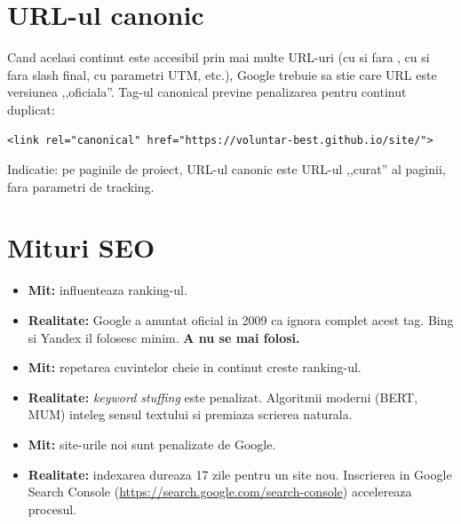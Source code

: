 \section{URL-ul canonic}

Cand acelasi continut este accesibil prin mai multe URL-uri (cu si fara , cu si fara slash final, cu parametri UTM, etc.), Google trebuie sa stie care URL este versiunea ,,oficiala''. Tag-ul canonical previne penalizarea pentru continut duplicat:

\begin{lstlisting}[style=html]
<link rel="canonical" href="https://voluntar-best.github.io/site/">
\end{lstlisting}

Indicatie: pe paginile de proiect, URL-ul canonic este URL-ul ,,curat'' al paginii, fara parametri de tracking.

\section{Mituri SEO}

\begin{itemize}
  \item \textbf{Mit:}  influenteaza ranking-ul.
  \item \textbf{Realitate:} Google a anuntat oficial in 2009 ca ignora complet acest tag. Bing si Yandex il folosesc minim. \textbf{A nu se mai folosi.}
\end{itemize}

\begin{itemize}
  \item \textbf{Mit:} repetarea cuvintelor cheie in continut creste ranking-ul.
  \item \textbf{Realitate:} \emph{keyword stuffing} este penalizat. Algoritmii moderni (BERT, MUM) inteleg sensul textului si premiaza scrierea naturala.
\end{itemize}

\begin{itemize}
  \item \textbf{Mit:} site-urile noi sunt penalizate de Google.
  \item \textbf{Realitate:} indexarea dureaza 1\textendash{}7 zile pentru un site nou. Inscrierea in Google Search Console (\url{https://search.google.com/search-console}) accelereaza procesul.
\end{itemize}

